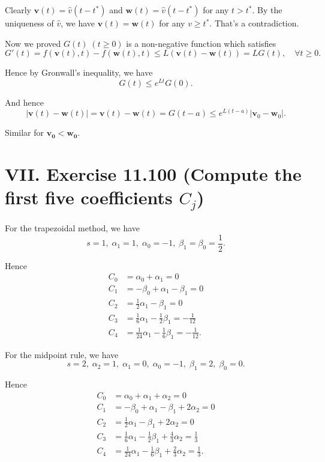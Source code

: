 \documentclass[twoside,a4paper]{article}
\begin{document}
Clearly $\mathbf{v}(t)=\hat{v}(t-t^*)$ and $\mathbf{w}(t)=\hat{v}(t-t^*)$ for any $t>t^*$. By the uniqueness of $\hat{v}$, we have $\mathbf{v}(t)=\mathbf{w}(t)$ for any $v\geq t^*$. That's a contradiction.

Now we proved $G(t)\;(t\geq 0)$ is a non-negative function which satisfies
\begin{equation*}
    G'(t) = f(\mathbf{v}(t),t)-f(\mathbf{w}(t),t) \leq L(\mathbf{v}(t)-\mathbf{w}(t))=LG(t),\quad \forall t\geq 0.
\end{equation*}

Hence by Gronwall's inequality, we have
\begin{equation*}
    G(t)\leq e^{Lt}G(0).
\end{equation*}

And hence
\begin{equation*}
    |\mathbf{v}(t)-\mathbf{w}(t)|=\mathbf{v}(t)-\mathbf{w}(t)=G(t-a)\leq e^{L(t-a)}|\mathbf{v}_0-\mathbf{w}_0|.
\end{equation*}

Similar for $\mathbf{v_0}<\mathbf{w_0}$.

\section*{VII. Exercise 11.100 (Compute the first five coefficients $C_j$)}

\;\;\;\; For the trapezoidal method, we have
\begin{equation*}
    s=1,\;\alpha_1=1,\;\alpha_0=-1,\;\beta_1=\beta_0=\frac{1}{2}.
\end{equation*}

Hence
\begin{align*}
    C_0 &= \alpha_0+\alpha_1=0\\
    C_1 &= -\beta_0+\alpha_1-\beta_1=0\\
    C_2 &= \frac{1}{2}\alpha_1-\beta_1=0\\
    C_3 &= \frac{1}{6}\alpha_1-\frac{1}{2}\beta_1=-\frac{1}{12}\\
    C_4 &= \frac{1}{24}\alpha_1-\frac{1}{6}\beta_1=-\frac{1}{12}.
\end{align*}

For the midpoint rule, we have
\begin{equation*}
    s=2,\;\alpha_2=1,\;\alpha_1=0,\;\alpha_0=-1,\;\beta_1=2,\;\beta_0=0.
\end{equation*}

Hence
\begin{align*}
    C_0 &= \alpha_0+\alpha_1+\alpha_2=0\\
    C_1 &= -\beta_0+\alpha_1-\beta_1+2\alpha_2=0\\
    C_2 &= \frac{1}{2}\alpha_1-\beta_1+2\alpha_2=0\\
    C_3 &= \frac{1}{6}\alpha_1-\frac{1}{2}\beta_1+\frac{4}{3}\alpha_2=\frac{1}{3}\\
    C_4 &= \frac{1}{24}\alpha_1-\frac{1}{6}\beta_1+\frac{2}{3}\alpha_2=\frac{1}{3}.
\end{align*}
\end{document}
